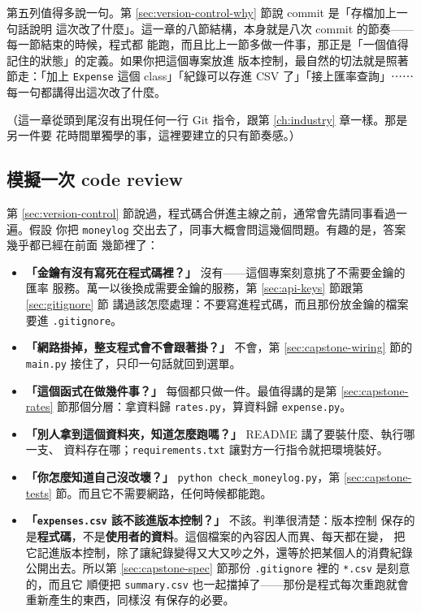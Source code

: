 第五列值得多說一句。第 \ref{sec:version-control-why} 節說 commit 是「存檔加上一句話說明
這次改了什麼」。這一章的八節結構，本身就是八次 commit 的節奏——每一節結束的時候，程式都
能跑，而且比上一節多做一件事，那正是「一個值得記住的狀態」的定義。如果你把這個專案放進
版本控制，最自然的切法就是照著節走：「加上 \texttt{Expense} 這個 class」「紀錄可以存進
CSV 了」「接上匯率查詢」⋯⋯每一句都講得出這次改了什麼。

（這一章從頭到尾沒有出現任何一行 Git 指令，跟第 \ref{ch:industry} 章一樣。那是另一件要
花時間單獨學的事，這裡要建立的只有節奏感。）

\subsection*{模擬一次 code review}

第 \ref{sec:version-control} 節說過，程式碼合併進主線之前，通常會先請同事看過一遍。假設
你把 \texttt{moneylog} 交出去了，同事大概會問這幾個問題。有趣的是，答案幾乎都已經在前面
幾節裡了：

\begin{itemize}
\item \textbf{「金鑰有沒有寫死在程式碼裡？」} 沒有——這個專案刻意挑了不需要金鑰的匯率
服務。萬一以後換成需要金鑰的服務，第 \ref{sec:api-keys} 節跟第 \ref{sec:gitignore} 節
講過該怎麼處理：不要寫進程式碼，而且那份放金鑰的檔案要進 \texttt{.gitignore}。
\item \textbf{「網路掛掉，整支程式會不會跟著掛？」} 不會，第 \ref{sec:capstone-wiring}
節的 \texttt{main.py} 接住了，只印一句話就回到選單。
\item \textbf{「這個函式在做幾件事？」} 每個都只做一件。最值得講的是第
\ref{sec:capstone-rates} 節那個分層：拿資料歸 \texttt{rates.py}，算資料歸
\texttt{expense.py}。
\item \textbf{「別人拿到這個資料夾，知道怎麼跑嗎？」} README 講了要裝什麼、執行哪一支、
資料存在哪；\texttt{requirements.txt} 讓對方一行指令就把環境裝好。
\item \textbf{「你怎麼知道自己沒改壞？」} \texttt{python check\_moneylog.py}，第
\ref{sec:capstone-tests} 節。而且它不需要網路，任何時候都能跑。
\item \textbf{「\texttt{expenses.csv} 該不該進版本控制？」} 不該。判準很清楚：版本控制
保存的是\textbf{程式碼}，不是\textbf{使用者的資料}。這個檔案的內容因人而異、每天都在變，
把它記進版本控制，除了讓紀錄變得又大又吵之外，還等於把某個人的消費紀錄公開出去。所以第
\ref{sec:capstone-spec} 節那份 \texttt{.gitignore} 裡的 \texttt{*.csv} 是刻意的，而且它
順便把 \texttt{summary.csv} 也一起擋掉了——那份是程式每次重跑就會重新產生的東西，同樣沒
有保存的必要。
\end{itemize}

